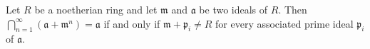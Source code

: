 Let $R$ be a noetherian ring and let $\mathfrak{m}$ and $\mathfrak{a}$ be two ideals of $R$. Then $\bigcap_{n=1}^{\infty} (\mathfrak{a} + \mathfrak{m}^n) = \mathfrak{a}$ if and only if $\mathfrak{m} + \mathfrak{p}_i \neq R$ for every associated prime ideal $\mathfrak{p}_i$ of $\mathfrak{a}$.

